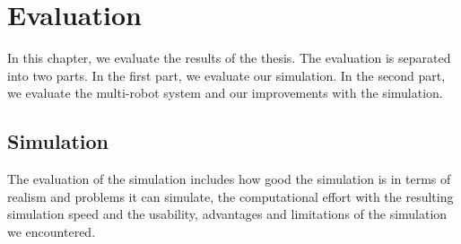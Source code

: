 \chapter{Evaluation}
\label{cha:evaluation}
In this chapter, we evaluate the results of the thesis. The evaluation is separated into two parts. In the first part, we evaluate our simulation. In the second part, we evaluate the multi-robot system and our improvements with the simulation.

\section{Simulation}
\label{sec:simulation}
The evaluation of the simulation includes how good the simulation is in terms of realism and problems it can simulate, the computational effort with the resulting simulation speed and the usability, advantages and limitations of the simulation we encountered. 

